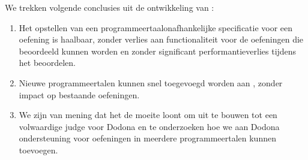 We trekken volgende conclusies uit de ontwikkeling van \tested{}:

\begin{enumerate}
    \item Het opstellen van een programmeertaalonafhankelijke specificatie voor een oefening is haalbaar, zonder verlies aan functionaliteit voor de oefeningen die beoordeeld kunnen worden en zonder significant performantieverlies tijdens het beoordelen.
    \item Nieuwe programmeertalen kunnen snel toegevoegd worden aan \tested{}, zonder impact op bestaande oefeningen.
    \item We zijn van mening dat het de moeite loont om \tested{} uit te bouwen tot een volwaardige judge voor Dodona en te onderzoeken hoe we aan Dodona ondersteuning voor oefeningen in meerdere programmeertalen kunnen toevoegen.
\end{enumerate}
